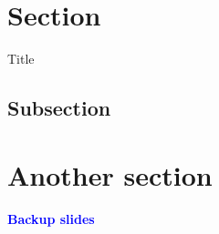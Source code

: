 \documentclass[xcolor=dvipsnames,professionalfonts]{beamer}
\begin{document}
\graphicspath{{./fig_slides/}}

\section{Section}
\begin{frame}{Title}

\end{frame}

\subsection{Subsection}
\begin{frame}[plain]
  
\end{frame}

\begin{frame}[standout]
  
\end{frame}

\section{Another section}
\begin{frame}
  
\end{frame}

\appendix


\begin{frame}[standout]
  \begin{center}
    \Large \bf
    \textcolor{Blue}{Backup slides}
  \end{center}
\end{frame}
\end{document}
